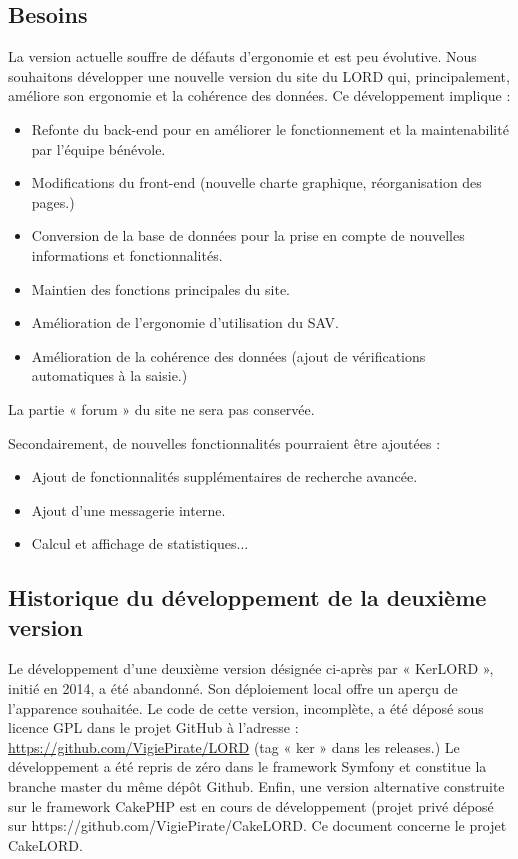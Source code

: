 ﻿\documentclass[a4paper,10pt]{article}
\begin{document}
\subsection{Besoins}
La version actuelle souffre de défauts d'ergonomie et est peu évolutive. Nous souhaitons développer une nouvelle version du site du LORD qui, principalement, améliore son ergonomie et la cohérence des données. Ce développement implique :

\begin{itemize}
\item Refonte du back-end pour en améliorer le fonctionnement et la maintenabilité par l'équipe bénévole.
\item Modifications du front-end (nouvelle charte graphique, réorganisation des pages.)
\item Conversion de la base de données pour la prise en compte de nouvelles informations et fonctionnalités. 
\item Maintien des fonctions principales du site.
\item Amélioration de l'ergonomie d'utilisation du SAV.
\item Amélioration de la cohérence des données (ajout de vérifications automatiques à la saisie.)
\end{itemize}

La partie « forum » du site ne sera pas conservée.   

Secondairement, de nouvelles fonctionnalités pourraient être ajoutées :
\begin{itemize}
\item Ajout de fonctionnalités supplémentaires de recherche avancée.
\item Ajout d'une messagerie interne.
\item Calcul et affichage de statistiques...
\end{itemize}

\subsection{Historique du développement de la deuxième version}

Le développement d’une deuxième version désignée ci-après par « KerLORD », initié en 2014, a été abandonné. Son déploiement local offre un aperçu de l’apparence souhaitée. Le code de cette version, incomplète, a été
déposé sous licence GPL dans le projet GitHub à l’adresse : \url{https://github.com/VigiePirate/LORD} (tag « ker » dans les releases.) Le développement a été repris de zéro dans le framework Symfony et constitue la branche master du même dépôt Github. Enfin, une version alternative construite sur le framework CakePHP est en cours de développement (projet privé déposé sur https://github.com/VigiePirate/CakeLORD. Ce document
concerne le projet CakeLORD.
\end{document}
